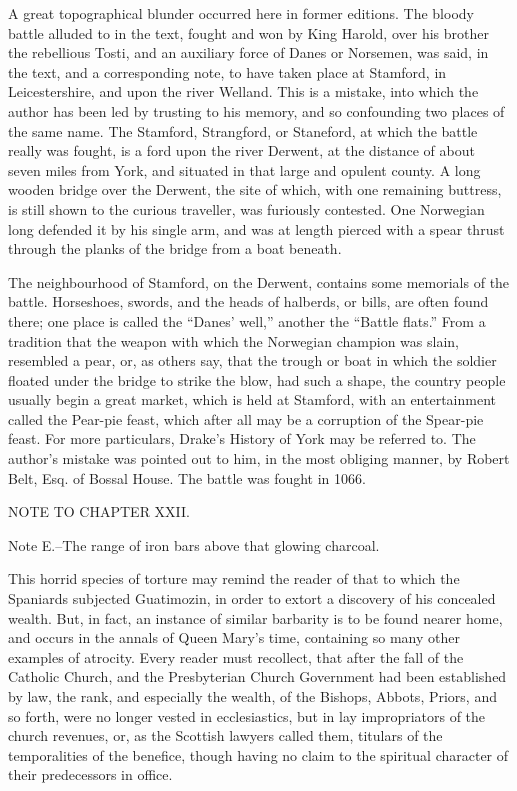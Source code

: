 A great topographical blunder occurred here in former editions. The
bloody battle alluded to in the text, fought and won by King Harold,
over his brother the rebellious Tosti, and an auxiliary force of Danes
or Norsemen, was said, in the text, and a corresponding note, to have
taken place at Stamford, in Leicestershire, and upon the river Welland.
This is a mistake, into which the author has been led by trusting to his
memory, and so confounding two places of the same name. The Stamford,
Strangford, or Staneford, at which the battle really was fought, is a
ford upon the river Derwent, at the distance of about seven miles from
York, and situated in that large and opulent county. A long wooden
bridge over the Derwent, the site of which, with one remaining buttress,
is still shown to the curious traveller, was furiously contested. One
Norwegian long defended it by his single arm, and was at length pierced
with a spear thrust through the planks of the bridge from a boat
beneath.

The neighbourhood of Stamford, on the Derwent, contains some memorials
of the battle. Horseshoes, swords, and the heads of halberds, or bills,
are often found there; one place is called the ``Danes' well,'' another
the ``Battle flats.'' From a tradition that the weapon with which the
Norwegian champion was slain, resembled a pear, or, as others say, that
the trough or boat in which the soldier floated under the bridge to
strike the blow, had such a shape, the country people usually begin a
great market, which is held at Stamford, with an entertainment called
the Pear-pie feast, which after all may be a corruption of the Spear-pie
feast. For more particulars, Drake's History of York may be referred to.
The author's mistake was pointed out to him, in the most obliging
manner, by Robert Belt, Esq. of Bossal House. The battle was fought in
1066.

NOTE TO CHAPTER XXII.

Note E.--The range of iron bars above that glowing charcoal.

This horrid species of torture may remind the reader of that to which
the Spaniards subjected Guatimozin, in order to extort a discovery of
his concealed wealth. But, in fact, an instance of similar barbarity is
to be found nearer home, and occurs in the annals of Queen Mary's time,
containing so many other examples of atrocity. Every reader must
recollect, that after the fall of the Catholic Church, and the
Presbyterian Church Government had been established by law, the rank,
and especially the wealth, of the Bishops, Abbots, Priors, and so forth,
were no longer vested in ecclesiastics, but in lay impropriators of the
church revenues, or, as the Scottish lawyers called them, titulars of
the temporalities of the benefice, though having no claim to the
spiritual character of their predecessors in office.

